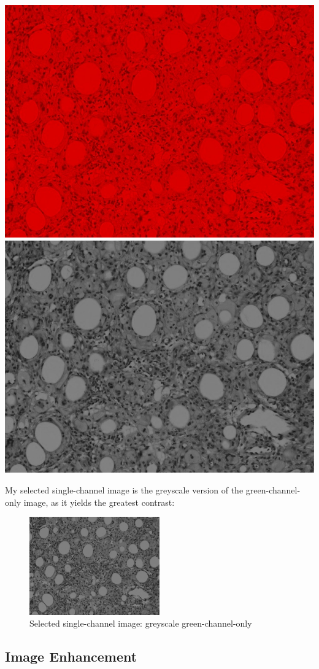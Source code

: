 \documentclass[a4paper]{article}
\begin{document}
\begin{minipage}{0.24\textwidth}
    \centering
    \includegraphics[width=\textwidth]{../code/task1/output/r_channel.jpg}
    \includegraphics[width=\textwidth]{../code/task1/output/r_channel_greyscale.jpg}
\end{minipage}

My selected single-channel image is the greyscale version of the green-channel-only image, as it yields the greatest contrast:
\begin{figure}[H]
    \centering
    \includegraphics[width=0.5\textwidth]{../code/task1/output/g_channel_greyscale.jpg}
    \caption{Selected single-channel image: greyscale green-channel-only}
\end{figure}

\subsection{Image Enhancement}
\end{document}
